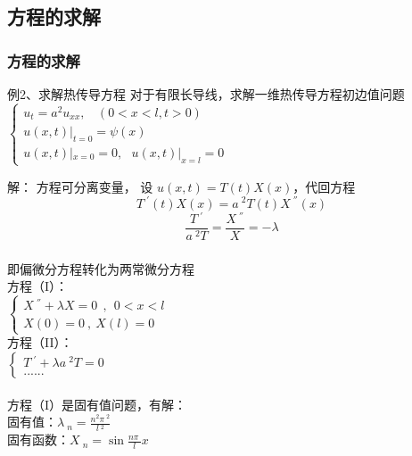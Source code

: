 \subsection{方程的求解}
\begin{frame}
	\frametitle{方程的求解}	
	\begin{exampleblock} {例2、求解热传导方程}
	对于有限长导线，求解一维热传导方程初边值问题 \\
	$\displaystyle \begin{cases}
		u_{t}=a^2u_{xx} ,~~~~ (0<x<l, t>0)\\
		u(x,t)|_{t=0}= \psi (x)  \\
		u(x,t)|_{x=0}= 0, ~~~  u(x,t)|_{x=l}= 0 
	\end{cases}$ \\
	\end{exampleblock}
	\alert{解：} 方程可分离变量，
	设 $\displaystyle  u(x,t)=T(t)X(x) $，代回方程 \\
	\begin{equation*}
		T~^{'}(t)X(x) =a~^2 T(t)X~^{''}(x) 
	\end{equation*}
	\begin{equation*}
		\frac{T~^{'}}{a~^2 T}=\frac{X~^{''} }{X} =-\lambda 
	\end{equation*}
\end{frame}	

\begin{frame}
	\frametitle{}	
	即偏微分方程转化为两常微分方程 \\
	方程（I）：\\
	$\displaystyle  \begin{cases}
		X~^{''} +\lambda X=0  ~~,~~ 0<x<l\\
		X(0)=0 ~,~X(l)=0
	\end{cases}$ \\	
	方程（II）：\\
	$\displaystyle  \begin{cases}
		T~^{'} +\lambda {a~^2 T}=0 \\
		......
	\end{cases}$ \\	
	~~~\hspace*{\fill} \\	
	方程（I）是固有值问题，有解：\\
	固有值：$\displaystyle  \lambda~_n=\frac{n^2\pi~^2}{l~^2}$ \\ 
	固有函数：{$\displaystyle  X~_n= \sin \frac{n\pi~}{l} x$}\\
\end{frame}	

